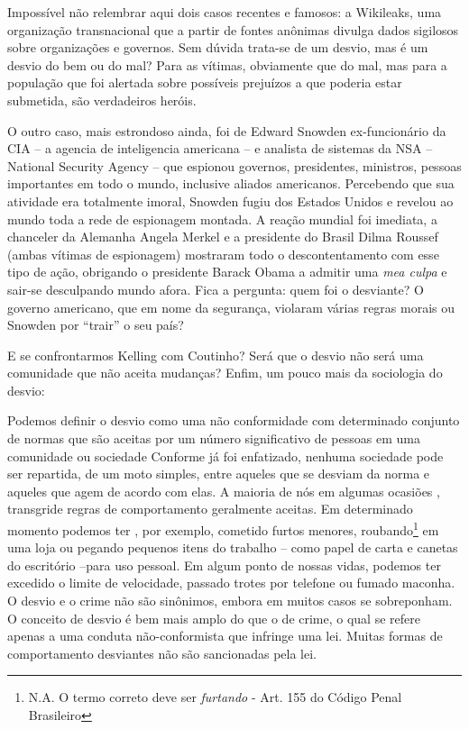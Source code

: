 \documentclass[
	12pt,				%
	openright,			%
	twoside,			%
	a4paper,			%
	chapter=TITLE,		%
	section=TITLE,		%
	subsection=TITLE,	%
	subsubsection=TITLE,%
	spanish,            %
	english,			%
	brazil				%
	]{abntex2}
\begin{document}
\par
Impossível não relembrar aqui dois casos recentes e famosos: a Wikileaks, uma organização transnacional que a partir de fontes anônimas divulga dados sigilosos sobre organizações e governos. Sem dúvida trata-se de um desvio, mas é um desvio do bem ou do mal? Para as vítimas, obviamente que do mal, mas para a população que foi alertada sobre possíveis prejuízos a que poderia estar submetida, são verdadeiros heróis.
\par
O outro caso, mais estrondoso ainda, foi de Edward Snowden ex-funcionário da CIA -- a agencia de inteligencia americana -- e analista de sistemas da NSA -- National Security Agency -- que espionou governos, presidentes, ministros, pessoas importantes em todo o mundo, inclusive aliados americanos. Percebendo que sua atividade era totalmente imoral, Snowden fugiu dos Estados Unidos e revelou ao mundo toda a rede
de espionagem montada. A reação mundial foi imediata, a chanceler da Alemanha Angela Merkel e a presidente do Brasil Dilma Roussef (ambas vítimas de espionagem) mostraram todo o descontentamento com esse tipo de ação, obrigando o presidente Barack Obama a admitir uma \textit{mea culpa} e sair-se desculpando mundo afora. Fica a pergunta: quem foi o desviante? O governo americano, que em nome da segurança, violaram várias regras morais ou Snowden por “trair” o seu país?
\par
E se confrontarmos Kelling com Coutinho? Será que o desvio não será uma comunidade que não aceita mudanças? Enfim, um pouco mais da sociologia do desvio:
\begin{citacao}
	Podemos definir o desvio como uma não conformidade com determinado conjunto de normas que são aceitas por um número significativo de pessoas em uma comunidade ou sociedade Conforme já foi enfatizado, nenhuma sociedade pode ser repartida, de um moto simples, entre aqueles que se desviam da norma e aqueles que agem de acordo com elas. A maioria de nós em algumas ocasiões , transgride regras de comportamento geralmente aceitas. Em determinado momento podemos ter , por exemplo, cometido furtos menores, roubando\footnote{N.A. O termo correto deve ser \textit{furtando} - Art. 155 do Código Penal Brasileiro} em uma loja ou pegando pequenos itens do trabalho -- como papel de carta e canetas do escritório --para uso pessoal. Em algum ponto de nossas vidas, podemos ter excedido o limite de velocidade, passado trotes por telefone ou fumado maconha.\\
	O desvio e o crime não são sinônimos, embora em muitos casos se sobreponham. O conceito de desvio é bem mais amplo do que o de crime, o qual se refere apenas a uma conduta não-conformista que infringe uma lei. Muitas formas de comportamento desviantes não são sancionadas pela lei.\cite[p. ~173]{Giddens}
\end{citacao}
\end{document}
